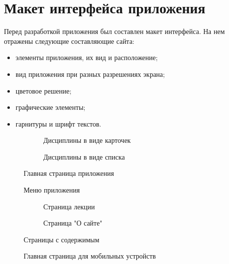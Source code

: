 \section{Макет интерфейса приложения}

Перед разработкой приложения был составлен макет интерфейса. На нем отражены следующие составляющие сайта:
\begin{itemize}
	\item элементы приложения, их вид и расположение;
	\item вид приложения при разных разрешениях экрана;
	\item цветовое решение;
	\item графические элементы;
	\item гарнитуры и шрифт текстов.
\end{itemize}

\begin{figure}
	\begin{subfigure}
		\caption{Дисциплины в виде карточек}
	\end{subfigure}
	\begin{subfigure}
		\caption{Дисциплины в виде списка}
	\end{subfigure}
	\caption{Главная страница приложения}
\end{figure}

\begin{figure}
	\caption{Меню приложения}
\end{figure}

\begin{figure}
	\begin{subfigure}
		\caption{Страница лекции}
	\end{subfigure}
	\begin{subfigure}
		\caption{Страница "О сайте"}
	\end{subfigure}
	\caption{Страницы с содержимым}
\end{figure}

\begin{figure}
	\caption{Главная страница для мобильных устройств}
\end{figure}